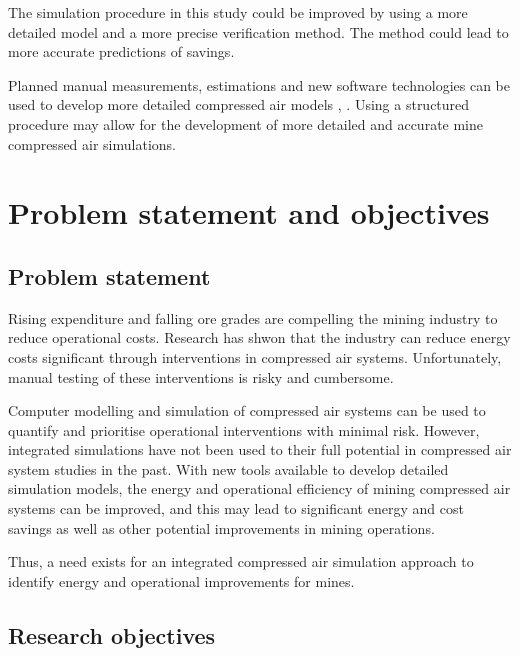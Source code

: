 		\par 
		 The simulation procedure in this study could be improved by using a more detailed model and a more precise verification method. The method could lead to more accurate predictions of savings. 
		\par
		Planned manual measurements, estimations and new software technologies can be used to develop more detailed compressed air models \cite{Bredenkamp2015Challeges}, \cite{Mare2017Evaluating}. Using a structured procedure may allow for the development of more detailed and accurate mine compressed air simulations.
		

\section{Problem statement and objectives}
	\subsection{Problem statement}
 		Rising expenditure and falling ore grades are compelling the mining industry to reduce operational costs. Research has shwon that the industry can reduce energy costs significant through interventions in compressed air systems. Unfortunately, manual testing of these interventions is risky and cumbersome.
 		\par
 		Computer modelling and simulation of compressed air systems can be used to quantify and prioritise operational interventions with minimal risk. However, integrated simulations have not been used to their full potential in compressed air system studies in the past. With new tools available to develop detailed simulation models, the energy and operational efficiency of mining compressed air systems can be improved, and this may lead to significant energy and cost savings as well as other potential improvements in mining operations.
 		\par 
 		Thus, a need exists for an integrated compressed air simulation approach to identify energy and operational improvements for mines.
 			\subsection{Research objectives}
 			
